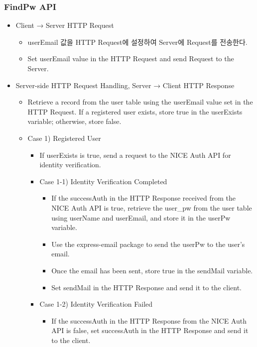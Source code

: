\documentclass[conference]{IEEEtran}
\begin{document}
\subsubsection{FindPw API}
\begin{itemize}
    \item Client → Server HTTP Request
    \begin{itemize}
        \item userEmail 값을 HTTP Request에 설정하여 Server에 Request를 전송한다.
        \item Set userEmail value in the HTTP Request and send Request to the Server.
        \\
    \end{itemize}
    \item Server-side HTTP Request Handling, Server → Client HTTP Response
    \begin{itemize}
        \item Retrieve a record from the user table using the userEmail value set in the HTTP Request. If a registered user exists, store true in the userExists variable; otherwise, store false.
        \item Case 1) Registered User
        \begin{itemize}
            \item If userExists is true, send a request to the NICE Auth API for identity verification.
            \item Case 1-1) Identity Verification Completed
            \begin{itemize}
                \item If the successAuth in the HTTP Response received from the NICE Auth API is true, retrieve the user\_pw from the user table using userName and userEmail, and store it in the userPw variable.
                \item Use the express-email package to send the userPw to the user's email.
                \item Once the email has been sent, store true in the sendMail variable.
                \item Set sendMail in the HTTP Response and send it to the client.
            \end{itemize}
            \item Case 1-2) Identity Verification Failed
            \begin{itemize}
                \item If the successAuth in the HTTP Response from the NICE Auth API is false, set successAuth in the HTTP Response and send it to the client.

\end{itemize}
\end{itemize}
\end{itemize}
\end{itemize}
\end{document}
